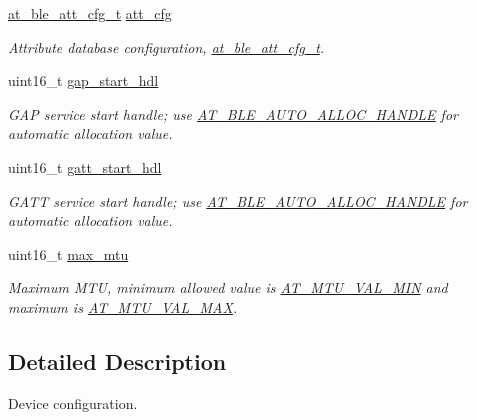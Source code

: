 \begin{DoxyCompactItemize}
\mbox{\hyperlink{structat__ble__att__cfg__t}{at\+\_\+ble\+\_\+att\+\_\+cfg\+\_\+t}} \mbox{\hyperlink{structat__ble__dev__config__t_af754df6933440c98456347855a39fcbc}{att\+\_\+cfg}}
\begin{DoxyCompactList}\small\item\em Attribute database configuration, \mbox{\hyperlink{structat__ble__att__cfg__t}{at\+\_\+ble\+\_\+att\+\_\+cfg\+\_\+t}}. \end{DoxyCompactList}\item 
uint16\+\_\+t \mbox{\hyperlink{structat__ble__dev__config__t_a7b7b7cf963dfb1fcd5f4abcf277fde51}{gap\+\_\+start\+\_\+hdl}}
\begin{DoxyCompactList}\small\item\em G\+AP service start handle; use \mbox{\hyperlink{at__ble__api_8h_a006780a0fa215bc901071f44a732758e}{A\+T\+\_\+\+B\+L\+E\+\_\+\+A\+U\+T\+O\+\_\+\+A\+L\+L\+O\+C\+\_\+\+H\+A\+N\+D\+LE}} for automatic allocation value. \end{DoxyCompactList}\item 
uint16\+\_\+t \mbox{\hyperlink{structat__ble__dev__config__t_a92bcdddc063e1c24d0edee9abcdfeea7}{gatt\+\_\+start\+\_\+hdl}}
\begin{DoxyCompactList}\small\item\em G\+A\+TT service start handle; use \mbox{\hyperlink{at__ble__api_8h_a006780a0fa215bc901071f44a732758e}{A\+T\+\_\+\+B\+L\+E\+\_\+\+A\+U\+T\+O\+\_\+\+A\+L\+L\+O\+C\+\_\+\+H\+A\+N\+D\+LE}} for automatic allocation value. \end{DoxyCompactList}\item 
uint16\+\_\+t \mbox{\hyperlink{structat__ble__dev__config__t_a51f85ee7f22451fd162c6db42979cf36}{max\+\_\+mtu}}
\begin{DoxyCompactList}\small\item\em Maximum M\+TU, minimum allowed value is \mbox{\hyperlink{at__ble__api_8h_a00d6694a3d0bdcc16a59e6da4d7fbb71}{A\+T\+\_\+\+M\+T\+U\+\_\+\+V\+A\+L\+\_\+\+M\+IN}} and maximum is \mbox{\hyperlink{at__ble__api_8h_aa5fe6d41c61adba5b395dafc27f35099}{A\+T\+\_\+\+M\+T\+U\+\_\+\+V\+A\+L\+\_\+\+M\+AX}}. \end{DoxyCompactList}\end{DoxyCompactItemize}


\subsection{Detailed Description}
Device configuration. 

